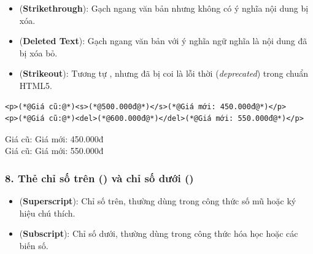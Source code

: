 \begin{itemize}[leftmargin=1.8em, itemsep=3pt, parsep=0pt]
    \item {} (\textbf{Strikethrough}): Gạch ngang văn bản nhưng không có ý nghĩa nội dung bị xóa.
    \item {} (\textbf{Deleted Text}): Gạch ngang văn bản với ý nghĩa ngữ nghĩa là nội dung đã bị xóa bỏ.
    \item {} (\textbf{Strikeout}): Tương tự , nhưng đã bị coi là lỗi thời (\textit{deprecated}) trong chuẩn HTML5.
\end{itemize}

\begin{codeWindow}
\begin{lstlisting}[language=HTML5]
<p>(*@Giá cũ:@*)<s>(*@500.000đ@*)</s>(*@Giá mới: 450.000đ@*)</p>
<p>(*@Giá cũ:@*)<del>(*@600.000đ@*)</del>(*@Giá mới: 550.000đ@*)</p>
\end{lstlisting}
\end{codeWindow}

\begin{tcolorbox}[
    enhanced,
    colback=white,
    colframe=primaryBlue!20,
    arc=6pt,
    boxrule=0.8pt,
    drop shadow=black!3!white,
    top=8pt, bottom=8pt, left=12pt, right=12pt,
    title={\sffamily\bfseries\scriptsize\color{codeComment} KẾT QUẢ HIỂN THỊ TRÊN TRÌNH DUYỆT (BROWSER PREVIEW)},
    coltitle=codeComment,
    colbacktitle=codeBg!80!white
]
Giá cũ:  Giá mới: 450.000đ\\[3pt]
Giá cũ:  Giá mới: 550.000đ
\end{tcolorbox}


\subsubsection{8. Thẻ chỉ số trên () và chỉ số dưới ()}

\begin{itemize}[leftmargin=1.8em, itemsep=3pt, parsep=0pt]
    \item {} (\textbf{Superscript}): Chỉ số trên, thường dùng trong công thức số mũ hoặc ký hiệu chú thích.
    \item {} (\textbf{Subscript}): Chỉ số dưới, thường dùng trong công thức hóa học hoặc các biến số.
\end{itemize}

